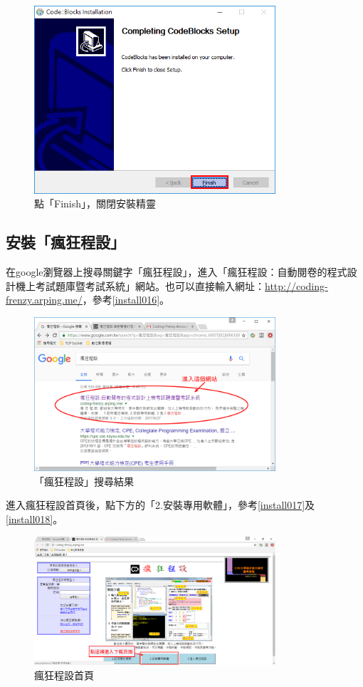		\begin{figure}[H]
			\centering
			\includegraphics[width=0.8\textwidth]{fig/install_and_setting/install_015_setup12}
			\caption{點「Finish」，關閉安裝精靈}
		\end{figure}
	
\subsection{安裝「瘋狂程設」}
在google瀏覽器上搜尋關鍵字「瘋狂程設」，進入「瘋狂程設：自動閱卷的程式設計機上考試題庫暨考試系統」網站。也可以直接輸入網址：\url{http://coding-frenzy.arping.me/}，參考\autoref{install016}。
		\begin{figure}[H]
			\centering
			\includegraphics[width=0.8\textwidth]{fig/install_and_setting/install_016}
			\caption{「瘋狂程設」搜尋結果}
			\label{install016}
		\end{figure}
		進入瘋狂程設首頁後，點下方的「2.安裝專用軟體」，參考\autoref{install017}及\autoref{install018}。
		\begin{figure}[H]
			\centering
			\includegraphics[width=0.8\textwidth]{fig/install_and_setting/install_017}
			\caption{瘋狂程設首頁}
			\label{install017}
		\end{figure}
		
